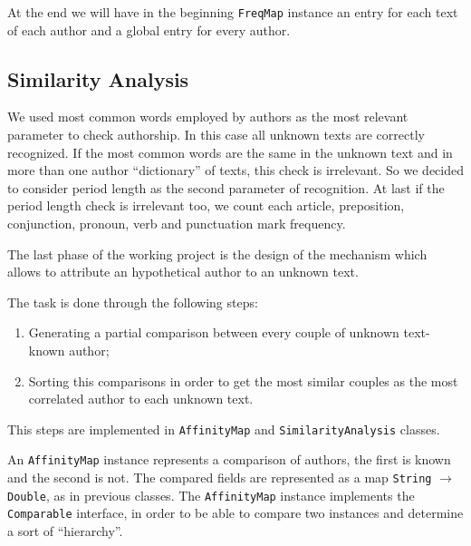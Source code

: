 \documentclass[a4paper,11pt, twoside]{article}
\begin{document}
		\bigskip
		\noindent
		At the end we will have in the beginning \lstinline|FreqMap| instance an entry for each text of each author and a global entry for every author.
	
	\subsection{Similarity Analysis}
		We used most common words employed by authors as the most relevant parameter to check authorship. In this case all unknown texts are correctly recognized. If the most common words are the same in the unknown text and in more than one author ``dictionary'' of texts, this check is irrelevant. So we decided to consider period length as the second parameter of recognition. At last if the period length check is irrelevant too, we count each article, preposition, conjunction, pronoun, verb and punctuation mark frequency.

		\bigskip

		\noindent
		The last phase of the working project is the design of the mechanism which allows to attribute an hypothetical author to an unknown text.
		
		\noindent
		The task is done through the following steps: 
		\begin{enumerate}
			\item Generating a partial comparison between every couple of unknown text-known author;
			\item Sorting this comparisons in order to get the most similar couples as the most correlated author to each unknown text.
		\end{enumerate}

		\noindent
		This steps are implemented in \lstinline|AffinityMap| and \lstinline|SimilarityAnalysis| classes.
		
		\noindent
		An \lstinline|AffinityMap| instance represents a comparison of authors, the first is known and the second is not. The compared fields are represented as a map \lstinline|String| $\to$ \lstinline|Double|, as in previous classes. The \lstinline|AffinityMap| instance implements the \lstinline|Comparable| interface, in order to be able to compare two instances and determine a sort of ``hierarchy''.
		
\end{document}
